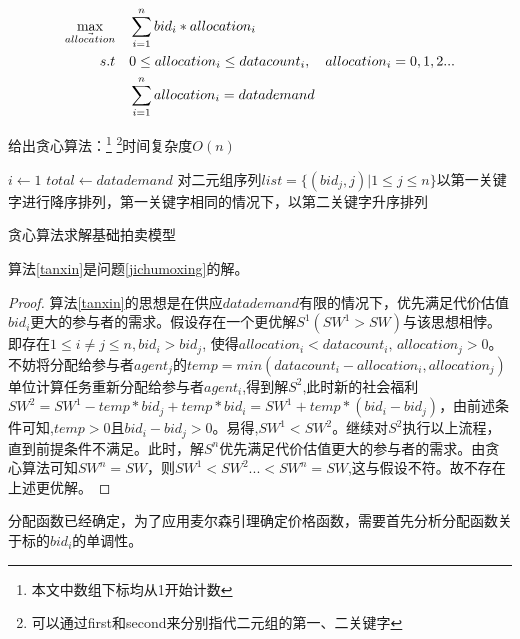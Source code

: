 \documentclass[promaster]{thesis-uestc}
\begin{document}
\begin{align}
    \label{jichumoxing}\max_{\vec{allocation}} \quad&\sum_{i=1}^{n}{bid_i*allocation_i}\\
    s.t                     \quad& 0\leq allocation_i\leq datacount_i,\quad allocation_i = {0,1,2...}\notag\\
                            \quad& \sum_{i=1}^{n}{allocation_i} = datademand\notag 
\end{align}

给出贪心算法：\footnote{本文中数组下标均从1开始计数}
\footnote{可以通过first和second来分别指代二元组的第一、二关键字}时间复杂度$O(n)$

\begin{algorithm}[H] 
    $i \leftarrow 1$\;
    $total \leftarrow datademand $\;
    对二元组序列$list = \{(bid_j,j)|1 \leq j \leq n\}$以第一关键字进行降序排列，第一关键字相同的情况下，以第二关键字升序排列\;
\caption{贪心算法求解基础拍卖模型}
\label{tanxin}
\end{algorithm}

\begin{theorem}
算法\ref{tanxin}是问题\ref{jichumoxing}的解。
\end{theorem}

\begin{proof}
    算法\ref{tanxin}的思想是在供应$datademand$有限的情况下，优先满足代价估值$bid_i$更大的参与者的需求。假设存在一个更优解$S^1(SW^1 > SW)$与该思想相悖。即存在$1 \leq i \neq j \leq n,bid_i > bid_j$, 使得$allocation_i < datacount_i \text{, } allocation_j > 0$。不妨将分配给参与者$agent_j$的$temp = min(datacount_i - allocation_i,allocation_j)$单位计算任务重新分配给参与者$agent_i$,得到解$S^2$,此时新的社会福利$SW^2= SW^1- temp*bid_j + temp*bid_i=SW^1+temp*(bid_i-bid_j)$，由前述条件可知,$temp > 0$且$bid_i - bid_j > 0$。易得,$SW^1<SW^2 $。继续对$S^2$执行以上流程，直到前提条件不满足。此时，解$S^n$优先满足代价估值更大的参与者的需求。由贪心算法可知$SW^n = SW$，则$SW^1<SW^2...<SW^n=SW$,这与假设不符。故不存在上述更优解。
\end{proof}

分配函数已经确定，为了应用麦尔森引理确定价格函数，需要首先分析分配函数关于标的$bid_i$的单调性。
\end{document}
